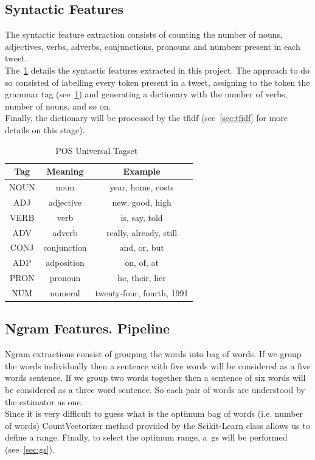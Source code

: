 \subsection{Syntactic Features}
The syntactic feature extraction consists of counting the number of nouns, adjectives, verbs, adverbs, conjunctions, pronouns and numbers present in each tweet.\\
The~\cref{tab:pos} details the syntactic features extracted in this project. The approach to do so consisted of labelling every token present in a tweet, assigning to the token the grammar tag (see~\cref{tab:pos}) and generating a dictionary with the number of verbs, number of nouns, and so on.\\
Finally, the dictionary will be processed by the \ac{tfidf} (see~\cref{sec:tfidf} for more details on this stage).
\begin{table}[h!]
	\centering
	\begin{tabular}{||c c c||} 
		\hline
		\textbf{Tag} & \textbf{Meaning} & \textbf{Example} \\ [0.5ex] 
		\hline\hline
		NOUN & noun & year, home, costs \\ 
		ADJ & adjective & new, good, high \\
		VERB & verb & is, say, told \\
		ADV & adverb & really, already, still \\
		CONJ & conjunction & and, or, but \\
		ADP & adposition & on, of, at \\
		PRON & pronoun & he, their, her \\
		NUM & numeral & twenty-four, fourth, 1991 \\
		[1ex] 
		\hline
	\end{tabular}
	\caption{POS Universal Tagset~\cite{pos}}
	\label{tab:pos}
\end{table}
\subsection{Ngram Features. Pipeline}
Ngram extractions consist of grouping the words into bag of words. If we group the words individually then a sentence with five words will be considered as a five words sentence. If we group two words together then a sentence of six words will be considered as a three word sentence. So each pair of words are understood by the estimator as one.\\
Since it is very difficult to guess what is the optimum bag of words (i.e. number of words) CountVectorizer method provided by the Scikit-Learn class allows us to define a range. Finally, to select the optimum range, a~\ac{gs} will be performed (see~\cref{sec:gs}).

